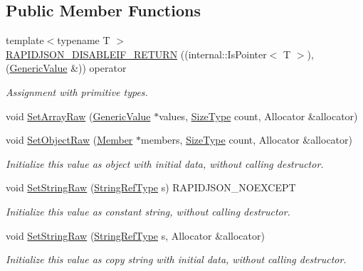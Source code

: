 \subsection*{Public Member Functions}
\begin{DoxyCompactItemize}
\item 
{\footnotesize template$<$typename T $>$ }\\\hyperlink{classGenericValue_a4a4418a93777942e1fb7ea71f8aaf680}{R\+A\+P\+I\+D\+J\+S\+O\+N\+\_\+\+D\+I\+S\+A\+B\+L\+E\+I\+F\+\_\+\+R\+E\+T\+U\+RN} ((internal\+::\+Is\+Pointer$<$ T $>$),(\hyperlink{classGenericValue}{Generic\+Value} \&)) operator
\begin{DoxyCompactList}\small\item\em Assignment with primitive types. \end{DoxyCompactList}\item 
void \hyperlink{classGenericValue_a8f5f309065479de40a16cf28a340da65}{Set\+Array\+Raw} (\hyperlink{classGenericValue}{Generic\+Value} $\ast$values, \hyperlink{rapidjson_8h_a5ed6e6e67250fadbd041127e6386dcb5}{Size\+Type} count, Allocator \&allocator)
\item 
void \hyperlink{classGenericValue_a26c8ec7d68858df1038506df7fcff22d}{Set\+Object\+Raw} (\hyperlink{classGenericValue_a7ccf27c44058b4c11c3efc6473afb886}{Member} $\ast$members, \hyperlink{rapidjson_8h_a5ed6e6e67250fadbd041127e6386dcb5}{Size\+Type} count, Allocator \&allocator)
\begin{DoxyCompactList}\small\item\em Initialize this value as object with initial data, without calling destructor. \end{DoxyCompactList}\item 
void \hyperlink{classGenericValue_a1451603922dcdf34976f125dc60f70ee}{Set\+String\+Raw} (\hyperlink{classGenericValue_a32e0f30ee278072374c8168b14d3317f}{String\+Ref\+Type} s) R\+A\+P\+I\+D\+J\+S\+O\+N\+\_\+\+N\+O\+E\+X\+C\+E\+PT
\begin{DoxyCompactList}\small\item\em Initialize this value as constant string, without calling destructor. \end{DoxyCompactList}\item 
void \hyperlink{classGenericValue_ad3d91db36dfdbfc1af40a79aae07723c}{Set\+String\+Raw} (\hyperlink{classGenericValue_a32e0f30ee278072374c8168b14d3317f}{String\+Ref\+Type} s, Allocator \&allocator)
\begin{DoxyCompactList}\small\item\em Initialize this value as copy string with initial data, without calling destructor. \end{DoxyCompactList}\item 

\end{DoxyCompactItemize}
